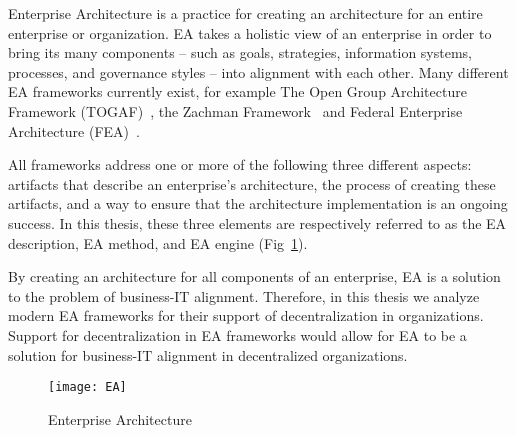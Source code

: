 Enterprise Architecture is a practice for creating an architecture for an entire enterprise or organization. EA takes a holistic view of an enterprise in order to bring its many components -- such as goals, strategies, information systems, processes, and governance styles -- into alignment with each other. Many different EA frameworks currently exist, for example The Open Group Architecture Framework (TOGAF)~\cite{togaf9.1}, the Zachman Framework~\cite{zachman} and Federal Enterprise Architecture (FEA)~\cite{FEA_PMO2007}. 

All frameworks address one or more of the following three different aspects: artifacts that describe an enterprise's architecture, the process of creating these artifacts, and a way to ensure that the architecture implementation is an ongoing success. In this thesis, these three elements are respectively referred to as the EA description, EA method, and EA engine (Fig~\ref{fig:EA_general}). 

By creating an architecture for all components of an enterprise, EA is a solution to the problem of business-IT alignment. Therefore, in this thesis we analyze modern EA frameworks for their support of decentralization in organizations. Support for decentralization in EA frameworks would allow for EA to be a solution for business-IT alignment in decentralized organizations. 
\begin{figure}
\texttt{[image: EA]}
\caption{Enterprise Architecture}
\label{fig:EA_general}
\end{figure}



